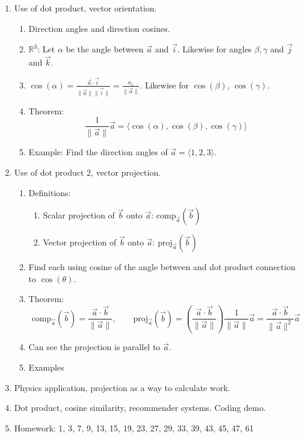 \documentclass{article}
\begin{document}
\begin{enumerate}
\item Use of dot product, vector orientation.
\begin{enumerate}
\item Direction angles and direction cosines.
\item $\mathbb{R}^3$: Let $\alpha$ be the angle between $\vec{a}$ and $\vec{i}$. Likewise for angles $\beta, \gamma$ and $\vec{j}$ and $\vec{k}$. 
\item $\cos(\alpha) = \frac{\vec{a}\cdot\vec{i}}{\|\vec{a}\| \|\vec{i}\|} = \frac{a_1}{\|\vec{a}\|}$. Likewise for $\cos(\beta)$, $\cos(\gamma)$. 
\item Theorem:
\[
\frac{1}{\| \vec{a} \|} \vec{a} = \langle \cos(\alpha), \cos(\beta), \cos(\gamma) \rangle
\]
\item Example: Find the direction angles of $\vec{a} = \langle 1,2,3 \rangle$.
\end{enumerate}

\item Use of dot product 2, vector projection.
\begin{enumerate}
\item Definitions:
\begin{enumerate}
\item Scalar projection of $\vec{b}$ onto $\vec{a}$: $\text{comp}_{\vec{a}} (\vec{b})$
\item Vector projection of $\vec{b}$ onto $\vec{a}$: $\text{proj}_{\vec{a}} (\vec{b})$
\end{enumerate}
\item Find each using cosine of the angle between and dot product connection to $\cos(\theta)$.
\item Theorem:
\[
\text{comp}_{\vec{a}} (\vec{b}) = \frac{\vec{a} \cdot \vec{b}}{\|\vec{a}\|}, \quad\quad \text{proj}_{\vec{a}} (\vec{b}) = \left(\frac{\vec{a} \cdot \vec{b}}{\|\vec{a}\|} \right) \frac{1}{\|\vec{a}\|}\vec{a} = \frac{\vec{a} \cdot \vec{b}}{\|\vec{a}\|^2} \vec{a}
\]
\item Can see the projection is parallel to $\vec{a}$.
\item Examples
\end{enumerate}

\item Physics application, projection as a way to calculate work.

\item Dot product, cosine similarity, recommender systems. Coding demo.

\item Homework: 1, 3, 7, 9, 13, 15, 19, 23, 27, 29, 33, 39, 43, 45, 47, 61

\end{enumerate}
\end{document}
